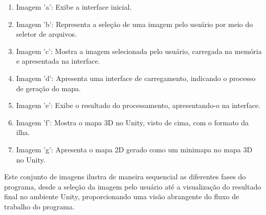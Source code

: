 \begin{enumerate}
	\item Imagem 'a': Exibe a interface inicial.
	\item Imagem 'b': Representa a seleção de uma imagem pelo usuário por meio do seletor de arquivos.
	\item Imagem 'c': Mostra a imagem selecionada pelo usuário, carregada na memória e apresentada na interface.
	\item Imagem 'd': Apresenta uma interface de carregamento, indicando o processo de geração do mapa.
	\item Imagem 'e': Exibe o resultado do processamento, apresentando-o na interface.
	\item Imagem 'f': Mostra o mapa 3D no Unity, visto de cima, com o formato da ilha.
	\item Imagem 'g': Apresenta o mapa 2D gerado como um minimapa no mapa 3D no Unity.
\end{enumerate}

Este conjunto de imagens ilustra de maneira sequencial as diferentes fases do programa, desde a seleção da imagem pelo usuário até a visualização do resultado final no ambiente Unity, proporcionando uma visão abrangente do fluxo de trabalho do programa.